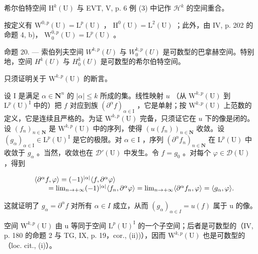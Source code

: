 希尔伯特空间 \(\mathrm{H}^k (\mathrm{U})\) 与 EVT, V, p. 6 例 (3) 中记作 \(\mathcal{H}^k\) 的空间重合。

按定义有 \(\mathrm{W}^{0,p}(\mathrm{U})=\mathrm{L}^{p}(\mathrm{U})\) ， \(\mathrm{H}^{0}(\mathrm{U})=\mathrm{L}^{2}(\mathrm{U})\) ；此外，由 IV, p. 202 的命题 4, b)， \(\mathrm{W}_{0}^{0,p}(\mathrm{U})=\mathrm{L}^{p}(\mathrm{U})\) 。

命题 20. — 索伯列夫空间 \(W^{k,p}(U)\) 与 \(W_{0}^{k,p}(U)\) 是可数型的巴拿赫空间。特别地，空间 \(H^{k}(U)\) 与 \(H_{0}^{k}(U)\) 是可数型的希尔伯特空间。

只须证明关于 \(\mathrm{W}^{k,p}(\mathrm{U})\) 的断言。

设 I 是满足 \(\alpha \in \mathbf{N}^n\) 的 \(|\alpha| \leqslant k\) 所成的集。线性映射 \(u\) （从 \(\mathrm{W}^{k,p}(\mathrm{U})\) 到 \(\mathrm{L}^p (\mathrm{U})^{\mathrm{I}}\) 中的）把 \(f\) 对应到族 \((\partial^{\alpha}f)_{\alpha \in \mathrm{I}}\) ，它是单射；按 \(\mathrm{W}^{k,p}(\mathrm{U})\) 上范数的定义，它是连续且严格的。为证 \(\mathrm{W}^{k,p}(\mathrm{U})\) 完备，只须证它在 \(u\) 下的像是闭的。设 \((f_n)_{n \in \mathbf{N}}\) 是 \(\mathrm{W}^{k,p}(\mathrm{U})\) 中的序列，使得 \((u(f_n))_{n \in \mathbf{N}}\) 收敛。设 \((g_{\alpha})_{\alpha \in \mathrm{I}} \in \mathrm{L}^p (\mathrm{U})^{\mathrm{I}}\) 是它的极限。对 \(\alpha \in \mathrm{I}\) ，序列 \((\partial^{\alpha}f_n)_{n \in \mathbf{N}}\) 在 \(\mathrm{L}^p (\mathrm{U})\) 中收敛于 \(g_{\alpha}\) 。当然，收敛也在 \(\mathcal{D}'(\mathrm{U})\) 中发生。令 \(f = g_0\) 。对每个 \(\varphi \in \mathcal{D}(\mathrm{U})\) ，得到

\[
\begin{array}{r l} & {\langle \partial^ {\alpha} f, \varphi \rangle = (- 1) ^ {| \alpha |} \langle f, \partial^ {\alpha} \varphi \rangle} \\ & {\qquad = \lim _ {n \to + \infty} (- 1) ^ {| \alpha |} \langle f _ {n}, \partial^ {\alpha} \varphi \rangle = \lim _ {n \to + \infty} \langle \partial^ {\alpha} f _ {n}, \varphi \rangle = \langle g _ {\alpha}, \varphi \rangle .} \end{array}
\]

这就证明了 \(g_{\alpha} = \partial^{\alpha} f\) 对所有 \(\alpha \in I\) 成立，从而 \((g_{\alpha})_{\alpha \in I} = u(f)\) 属于 u 的像。

空间 \(\mathrm{W}^{k,p}(\mathrm{U})\) 由 u 等同于空间 \(\mathrm{L}^{p}(\mathrm{U})^{\mathrm{I}}\) 的一个子空间；后者是可数型的（IV, p. 180 的命题 2 与 TG, IX, p. 19，cor., (ii))），因而 \(\mathrm{W}^{k,p}(\mathrm{U})\) 也是可数型的（loc. cit., (i)）。

